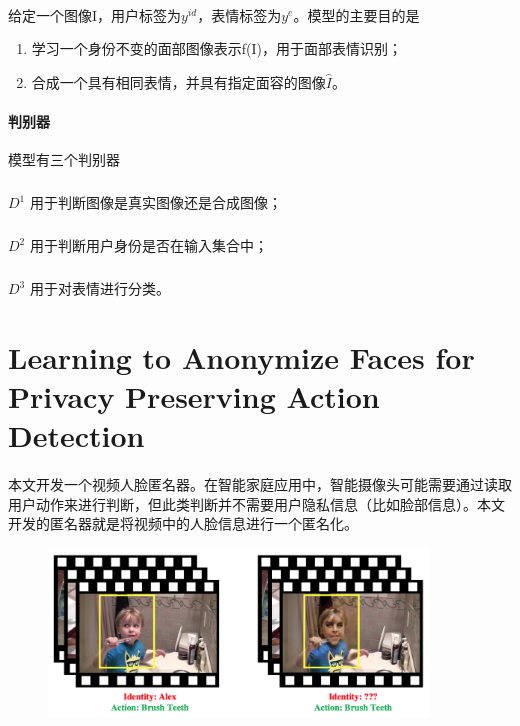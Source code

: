 \documentclass[12pt,a4paper]{article}
\begin{document}
\paragraph{} 给定一个图像I，用户标签为$y^{id}$，表情标签为$y^e$。模型的主要目的是
\begin{enumerate}
	\item 学习一个身份不变的面部图像表示f(I)，用于面部表情识别；
	\item 合成一个具有相同表情，并具有指定面容的图像$\hat I$。
\end{enumerate}

\paragraph{判别器} 模型有三个判别器
	\subparagraph{} $D^1$ 用于判断图像是真实图像还是合成图像；
	\subparagraph{} $D^2$ 用于判断用户身份是否在输入集合中；
	\subparagraph{} $D^3$ 用于对表情进行分类。

\newpage
\section{Learning to Anonymize Faces for Privacy Preserving Action Detection\cite{anonymize-faces}}
\paragraph{} 本文开发一个视频人脸匿名器。在智能家庭应用中，智能摄像头可能需要通过读取用户动作来进行判断，但此类判断并不需要用户隐私信息（比如脸部信息）。本文开发的匿名器就是将视频中的人脸信息进行一个匿名化。
\begin{figure}[H]
	\centering
	\includegraphics[width=0.9\textwidth]{../images/face-anonymity.png}
	\caption{}
	\label{laplace-distribution}
\end{figure}
\end{document}
